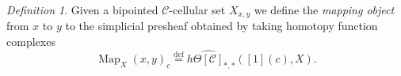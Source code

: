 \documentclass[leqno]{article}
\numberwithin{equation}{subsection}
\theoremstyle{plain}   %
\newtheorem{prop}[equation]{Proposition}
\theoremstyle{remark}
\newtheorem{defn}[equation]{Definition}
\theoremstyle{plain}
\DeclareMathOperator{\Ob}{Ob}
\DeclareMathOperator{\Map}{Map}
\newcommand{\C}{\ensuremath{\mathcal{C}}}
\newcommand{\defeq}{\overset{\mathrm{def}}=}
\newcommand{\cellset}{\ensuremath{\widehat{\Theta[\mathcal{C}]}}}
\begin{document}
\begin{defn}
	Given a bipointed \(\C\)-cellular set \(X_{x,y}\) we define the \emph{mapping object} from \(x\) to \(y\) to the simplicial presheaf obtained by taking homotopy function complexes
	\[\Map_X(x,y)_c\defeq h\cellset_{\ast,\ast}([1](c), X).\]
\end{defn}
\begin{comment}
	We define a slightly modified version for special maps.

	\begin{defn}
		If \(G\) is a gadget, let \(\mathcal{G}\) denote the category of all gadgets with special maps between them.  Then we 	define the \emph{special mapping object} to be \[\Map^\mathbf{sp}_G(\alpha,\omega)_c=\mathcal{G}(C^\bullet_R(c),G(c)).\]
	\end{defn}

	\begin{prop}\label{goodgadgets}
		Given a necklace gadget \(T\), the special mapping object \[\Map^\mathbf{sp}_T(\alpha,\omega)\] is contractible.
	\end{prop}
	\begin{proof}
		Since \(T(c)\hookrightarrow \Delta[T](c)\) is a horizontal inner-anodyne and \(\Delta[T](c)\) is fibrant, we can compute \	(\Map^\mathbf{sp}_{T(c)}(\alpha,\omega)\) by the formula 
		\[\Map^\mathbf{sp}_T(\alpha,\omega)_{k,c} = \mathcal{G}(C_R^k(c),\Delta[T](c))\]
		but every map \(C^k_R(c)\to \Delta[T](c)\) factors through the map \(C^n_R(c)\to [1](c),\) and the only special map \([1]	(c)\to \Delta[T](c)\) is the one that maps \(c\) into \(c\times \dots \times c\) via the diagonal.
	\end{proof}

	\section{Comparing \(\mathfrak{C}(X)(x,y)\) with \(\Map_X(x,y)\)}

	We begin by defining a special category of gadgets \(\mathcal{Y}\), which is the full subcategory of the category of all 	gadgets whose objects are those gadgets \(G\) such that \(\Map_G(\alpha,\omega)\) is contractible.

	In particular, by Proposition \ref{goodgadgets}, we see that every necklace gadget belongs to this category, so it is indeed 	a category of gadgets.  We define a full subcategory \(\mathcal{Y}_{\mathrm{f}}\subseteq \mathcal{Y}\) to be the full 	subcategory of \(\mathcal{Y}\) spanned by the gadgets \(G\) such that \(G(c)\) is fibrant for all \(c\in \Ob \C\).


\end{comment}
\end{document}
